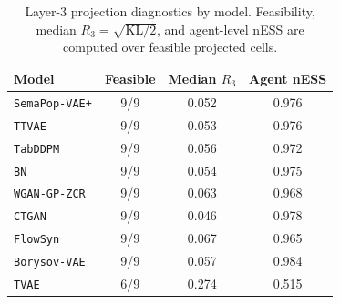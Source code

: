 \begin{table}[htbp]
\centering
\caption{Layer-3 projection diagnostics by model. Feasibility, median \(R_3=\sqrt{\mathrm{KL}/2}\), and agent-level nESS are computed over feasible projected cells.}
\label{tab:layer3_diagnostics}
\small
\begin{tabular}{lccc}
\toprule
Model & Feasible & Median \(R_3\) & Agent nESS \\
\midrule
\texttt{SemaPop-VAE+} & 9/9 & 0.052 & 0.976 \\
\texttt{TTVAE} & 9/9 & 0.053 & 0.976 \\
\texttt{TabDDPM} & 9/9 & 0.056 & 0.972 \\
\texttt{BN} & 9/9 & 0.054 & 0.975 \\
\texttt{WGAN-GP-ZCR} & 9/9 & 0.063 & 0.968 \\
\midrule
\texttt{CTGAN} & 9/9 & 0.046 & 0.978 \\
\texttt{FlowSyn} & 9/9 & 0.067 & 0.965 \\
\texttt{Borysov-VAE} & 9/9 & 0.057 & 0.984 \\
\texttt{TVAE} & 6/9 & 0.274 & 0.515 \\
\bottomrule
\end{tabular}
\end{table}
